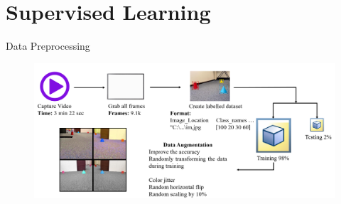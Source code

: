 \documentclass[10pt]{beamer}
\begin{document}

\section{Supervised Learning}


\begin{frame}{Data Preprocessing}
    \begin{figure}
        \centering
        \includegraphics[width=1\textwidth]{Images/datapreprocess.png}
    \end{figure}  
\end{frame}
\end{document}
